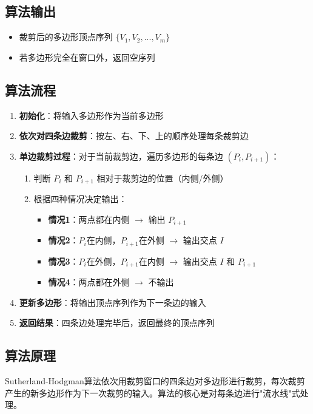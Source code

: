 \documentclass[12pt,a4paper]{article}
\begin{document}
\subsection{算法输出}
\begin{itemize}
    \item 裁剪后的多边形顶点序列 $\{V_1, V_2, ..., V_m\}$
    \item 若多边形完全在窗口外，返回空序列
\end{itemize}

\subsection{算法流程}
\begin{enumerate}
    \item \textbf{初始化}：将输入多边形作为当前多边形
    \item \textbf{依次对四条边裁剪}：按左、右、下、上的顺序处理每条裁剪边
    \item \textbf{单边裁剪过程}：对于当前裁剪边，遍历多边形的每条边 $(P_i, P_{i+1})$：
    \begin{enumerate}
        \item 判断 $P_i$ 和 $P_{i+1}$ 相对于裁剪边的位置（内侧/外侧）
        \item 根据四种情况决定输出：
        \begin{itemize}
            \item \textbf{情况1}：两点都在内侧 $\rightarrow$ 输出 $P_{i+1}$
            \item \textbf{情况2}：$P_i$在内侧，$P_{i+1}$在外侧 $\rightarrow$ 输出交点 $I$
            \item \textbf{情况3}：$P_i$在外侧，$P_{i+1}$在内侧 $\rightarrow$ 输出交点 $I$ 和 $P_{i+1}$
            \item \textbf{情况4}：两点都在外侧 $\rightarrow$ 不输出
        \end{itemize}
    \end{enumerate}
    \item \textbf{更新多边形}：将输出顶点序列作为下一条边的输入
    \item \textbf{返回结果}：四条边处理完毕后，返回最终的顶点序列
\end{enumerate}

\subsection{算法原理}
Sutherland-Hodgman算法依次用裁剪窗口的四条边对多边形进行裁剪，每次裁剪产生的新多边形作为下一次裁剪的输入。算法的核心是对每条边进行"流水线"式处理。
\end{document}
